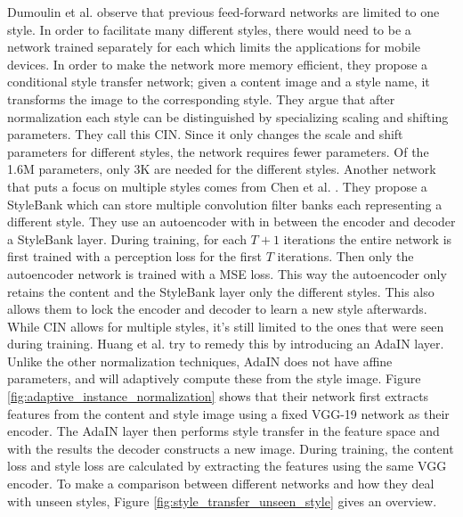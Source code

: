 Dumoulin et al. \cite{Dumoulin2016} observe that previous feed-forward networks are limited to one style.
In order to facilitate many different styles, there would need to be a network trained separately for each which limits the applications for mobile devices.
In order to make the network more memory efficient, they propose a conditional style transfer network; given a content image and a style name, it transforms the image to the corresponding style.
They argue that after normalization each style can be distinguished by specializing scaling and shifting parameters.
They call this \gls{CIN}.
Since it only changes the scale and shift parameters for different styles, the network requires fewer parameters.
Of the 1.6M parameters, only 3K are needed for the different styles.
Another network that puts a focus on multiple styles comes from Chen et al. \cite{Chen2017c}.
They propose a StyleBank which can store multiple convolution filter banks each representing a different style.
They use an autoencoder with in between the encoder and decoder a StyleBank layer.
During training, for each $T+1$ iterations the entire network is first trained with a perception loss for the first $T$ iterations.
Then only the autoencoder network is trained with a \gls{MSE} loss.
This way the autoencoder only retains the content and the StyleBank layer only the different styles.
This also allows them to lock the encoder and decoder to learn a new style afterwards.
While \gls{CIN} allows for multiple styles, it's still limited to the ones that were seen during training.
Huang et al. \cite{Huang2017} try to remedy this by introducing an \gls{AdaIN} layer.
Unlike the other normalization techniques, \gls{AdaIN} does not have affine parameters, and will adaptively compute these from the style image.
Figure \ref{fig:adaptive_instance_normalization} shows that their network first extracts features from the content and style image using a fixed VGG-19 network as their encoder.
The AdaIN layer then performs style transfer in the feature space and with the results the decoder constructs a new image.
During training, the content loss and style loss are calculated by extracting the features using the same VGG encoder.
To make a comparison between different networks and how they deal with unseen styles, Figure \ref{fig:style_transfer_unseen_style} gives an overview.

\begin{figure}[h]
	\centering
	\captionsetup{justification=centering}
\end{figure}

